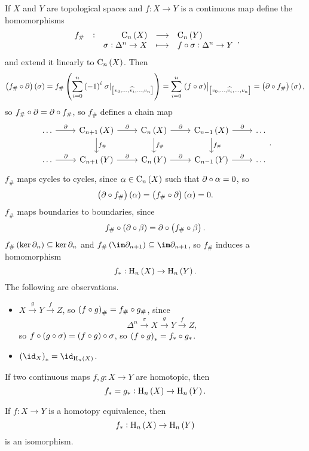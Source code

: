 If $ X $ and $ Y $ are topological spaces and $ f : X \to Y $ is a continuous map define the homomorphisms
$$ \function[f_\#]{\C_n\br{X}}{\C_n\br{Y}}{\sigma : \Delta^n \to X}{f \circ \sigma : \Delta^n \to Y}, $$
and extend it linearly to $ \C_n\br{X} $. Then
$$ \br{f_\# \circ \da}\br{\sigma} = f_\#\br{\sum_{i = 0}^n \br{-1}^i\eval{\sigma}_{\sbr{v_0, \dots, \widehat{v_i}, \dots, v_n}}} = \sum_{i = 0}^n \eval{\br{f \circ \sigma}}_{\sbr{v_0, \dots, \widehat{v_i}, \dots, v_n}} = \br{\da \circ f_\#}\br{\sigma}, $$
so $ f_\# \circ \partial = \partial \circ f_\# $, so $ f_\# $ defines a chain map
$$
\begin{tikzcd}
\dots \arrow{r}{\da} & \C_{n + 1}\br{X} \arrow{r}{\da} \arrow{d}{f_\#} & \C_n\br{X} \arrow{r}{\da} \arrow{d}{f_\#} & \C_{n - 1}\br{X} \arrow{r}{\da} \arrow{d}{f_\#} & \dots \\
\dots \arrow{r}{\da} & \C_{n + 1}\br{Y} \arrow{r}{\da} & \C_n\br{Y} \arrow{r}{\da} & \C_{n - 1}\br{Y} \arrow{r}{\da} & \dots
\end{tikzcd}.
$$
$ f_\# $ maps cycles to cycles, since $ \alpha \in \C_n\br{X} $ such that $ \partial \circ \alpha = 0 $, so
$$ \br{\da \circ f_\#}\br{\alpha} = \br{f_\# \circ \da}\br{\alpha} = 0. $$
$ f_\# $ maps boundaries to boundaries, since
$$ f_\# \circ \br{\da \circ \beta} = \da \circ \br{f_\# \circ \beta}. $$
$ f_\#\br{\ker \da_n} \subseteq \ker \da_n $ and $ f_\#\br{\im \da_{n + 1}} \subseteq \im \da_{n + 1} $, so $ f_\# $ induces a homomorphism
$$ f_* : \H_n\br{X} \to \H_n\br{Y}. $$
The following are observations.
\begin{itemize}
\item $ X \xrightarrow{g} Y \xrightarrow{f} Z $, so $ \br{f \circ g}_\# = f_\# \circ g_\# $, since
$$ \Delta^n \xrightarrow{\sigma} X \xrightarrow{g} Y \xrightarrow{f} Z, $$
so $ f \circ \br{g \circ \sigma} = \br{f \circ g} \circ \sigma $, so $ \br{f \circ g}_* = f_* \circ g_* $.
\item $ \br{\id_X}_* = \id_{\H_n\br{X}} $.
\end{itemize}

\begin{theorem}
\label{thm:2.10}
If two continuous maps $ f, g : X \to Y $ are homotopic, then
$$ f_* = g_* : \H_n\br{X} \to \H_n\br{Y}. $$
\end{theorem}

\begin{corollary}
If $ f : X \to Y $ is a homotopy equivalence, then
$$ f_* : \H_n\br{X} \to \H_n\br{Y} $$
is an isomorphism.
\end{corollary}

